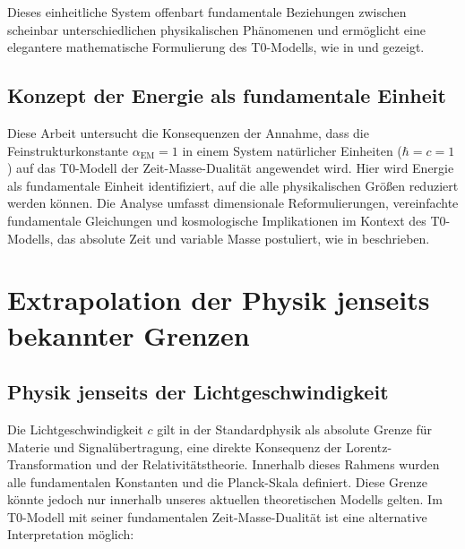 \documentclass[12pt,a4paper]{article}
\newcommand{\alphaEM}{\alpha_{\text{EM}}}
\begin{document}
	Dieses einheitliche System offenbart fundamentale Beziehungen zwischen scheinbar unterschiedlichen physikalischen Phänomenen und ermöglicht eine elegantere mathematische Formulierung des T0-Modells, wie in \cite{pascher_lagrange_2025} und \cite{pascher_alphabeta_2025} gezeigt.
	
	\subsection{Konzept der Energie als fundamentale Einheit}
	\label{subsec:energy_concept}
	
	Diese Arbeit untersucht die Konsequenzen der Annahme, dass die Feinstrukturkonstante \(\alphaEM = 1\) in einem System natürlicher Einheiten (\(\hbar = c = 1\)) auf das T0-Modell der Zeit-Masse-Dualität angewendet wird. Hier wird Energie als fundamentale Einheit identifiziert, auf die alle physikalischen Größen reduziert werden können. Die Analyse umfasst dimensionale Reformulierungen, vereinfachte fundamentale Gleichungen und kosmologische Implikationen im Kontext des T0-Modells, das absolute Zeit und variable Masse postuliert, wie in \cite{pascher_zeit_masse_2025} beschrieben.
	
	\section{Extrapolation der Physik jenseits bekannter Grenzen}
	\label{sec:beyond_limits}
	
	\subsection{Physik jenseits der Lichtgeschwindigkeit}
	\label{subsec:beyond_lightspeed}
	
	Die Lichtgeschwindigkeit \(c\) gilt in der Standardphysik als absolute Grenze für Materie und Signalübertragung, eine direkte Konsequenz der Lorentz-Transformation und der Relativitätstheorie. Innerhalb dieses Rahmens wurden alle fundamentalen Konstanten und die Planck-Skala definiert. Diese Grenze könnte jedoch nur innerhalb unseres aktuellen theoretischen Modells gelten. Im T0-Modell mit seiner fundamentalen Zeit-Masse-Dualität ist eine alternative Interpretation möglich:
	
\end{document}
